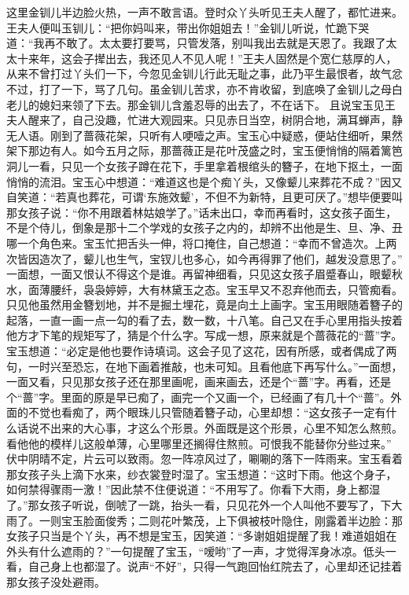 \documentclass[12pt,oneside]{book}
\begin{document}
这里金钏儿半边脸火热，一声不敢言语。登时众丫头听见王夫人醒了，都忙进来。王夫人便叫玉钏儿：“把你妈叫来，带出你姐姐去！”金钏儿听说，忙跪下哭道：“我再不敢了。太太要打要骂，只管发落，别叫我出去就是天恩了。我跟了太太十来年，这会子撵出去，我还见人不见人呢！”王夫人固然是个宽仁慈厚的人，从来不曾打过丫头们一下，今忽见金钏儿行此无耻之事，此乃平生最恨者，故气忿不过，打了一下，骂了几句。虽金钏儿苦求，亦不肯收留，到底唤了金钏儿之母白老儿的媳妇来领了下去。那金钏儿含羞忍辱的出去了，不在话下。
且说宝玉见王夫人醒来了，自己没趣，忙进大观园来。只见赤日当空，树阴合地，满耳蝉声，静无人语。刚到了蔷薇花架，只听有人哽噎之声。宝玉心中疑惑，便站住细听，果然架下那边有人。如今五月之际，那蔷薇正是花叶茂盛之时，宝玉便悄悄的隔着篱笆洞儿一看，只见一个女孩子蹲在花下，手里拿着根绾头的簪子，在地下抠土，一面悄悄的流泪。宝玉心中想道：“难道这也是个痴丫头，又像颦儿来葬花不成？”因又自笑道：“若真也葬花，可谓‘东施效颦’，不但不为新特，且更可厌了。”想毕便要叫那女孩子说：“你不用跟着林姑娘学了。”话未出口，幸而再看时，这女孩子面生，不是个侍儿，倒象是那十二个学戏的女孩子之内的，却辨不出他是生、旦、净、丑哪一个角色来。宝玉忙把舌头一伸，将口掩住，自己想道：“幸而不曾造次。上两次皆因造次了，颦儿也生气，宝钗儿也多心，如今再得罪了他们，越发没意思了。”
一面想，一面又恨认不得这个是谁。再留神细看，只见这女孩子眉蹙春山，眼颦秋水，面薄腰纤，袅袅婷婷，大有林黛玉之态。宝玉早又不忍弃他而去，只管痴看。只见他虽然用金簪划地，并不是掘土埋花，竟是向土上画字。宝玉用眼随着簪子的起落，一直一画一点一勾的看了去，数一数，十八笔。自己又在手心里用指头按着他方才下笔的规矩写了，猜是个什么字。写成一想，原来就是个蔷薇花的“蔷”字。宝玉想道：“必定是他也要作诗填词。这会子见了这花，因有所感，或者偶成了两句，一时兴至恐忘，在地下画着推敲，也未可知。且看他底下再写什么。”一面想，一面又看，只见那女孩子还在那里画呢，画来画去，还是个“蔷”字。再看，还是个“蔷”字。里面的原是早已痴了，画完一个又画一个，已经画了有几十个“蔷”。外面的不觉也看痴了，两个眼珠儿只管随着簪子动，心里却想：“这女孩子一定有什么话说不出来的大心事，才这么个形景。外面既是这个形景，心里不知怎么熬煎。看他他的模样儿这般单薄，心里哪里还搁得住熬煎。可恨我不能替你分些过来。”
伏中阴晴不定，片云可以致雨。忽一阵凉风过了，唰唰的落下一阵雨来。宝玉看着那女孩子头上滴下水来，纱衣裳登时湿了。宝玉想道：“这时下雨。他这个身子，如何禁得骤雨一激！”因此禁不住便说道：“不用写了。你看下大雨，身上都湿了。”那女孩子听说，倒唬了一跳，抬头一看，只见花外一个人叫他不要写了，下大雨了。一则宝玉脸面俊秀；二则花叶繁茂，上下俱被枝叶隐住，刚露着半边脸：那女孩子只当是个丫头，再不想是宝玉，因笑道：“多谢姐姐提醒了我！难道姐姐在外头有什么遮雨的？”一句提醒了宝玉，“嗳哟”了一声，才觉得浑身冰凉。低头一看，自己身上也都湿了。说声“不好”，只得一气跑回怡红院去了，心里却还记挂着那女孩子没处避雨。
\end{document}
